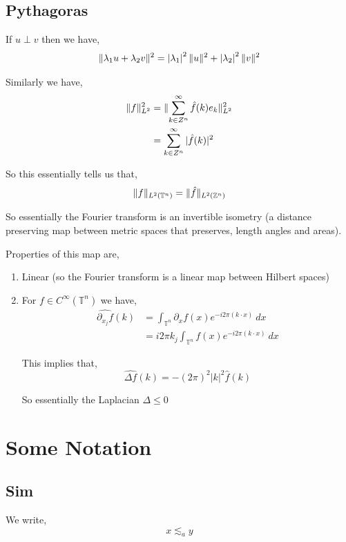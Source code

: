 \subsection{Pythagoras}
If $u \perp v$ then we have, 
\[
  \lVert\lambda_{1} u + \lambda_{2} v\rVert^2 = \left |\lambda_{1} \right |^2 \lVert u\rVert^2 + \left |\lambda_{2} \right |^2 \lVert v\rVert^2
\]

Similarly we have, 
\begin{align*}
  \lVert f\rVert^2_{L^2} &= \lVert\sum_{k \in Z^{n}}^{\infty} \hat{f}(k) e_k\rVert_{L^2}^2\\
                   &= \sum_{k \in Z^{n}}^{\infty}  | \hat{f}(k)|^2
\end{align*}

So this essentially tells us that, 
\[
  \lVert f\rVert_{L^2(\mathbb{T}^{n})} = \lVert\hat{f}\rVert_{L^2(\mathbb{Z}^{n})}
\]

So essentially the Fourier transform is an invertible isometry (a distance preserving map between metric spaces that preserves, length angles and areas).

\vspace{1em}

Properties of this map are,
\begin{enumerate}
  \item Linear (so the Fourier transform is a linear map between Hilbert spaces)
  \item For $f \in C^{\infty}(\mathbb{T}^{n})$ we have, 
    \begin{align*}
      \widehat{\partial_{x_j} f}(k) &= \int_{\mathbb{T}^{n}}^{}  \partial_x f(x) e^{-i 2\pi (k \cdot x)}\ dx\\
                          &= i 2\pi k_j \int_{\mathbb{T}^{n}}^{}  f(x) e^{-i 2\pi (k \cdot x)}\ dx
    \end{align*}

    This implies that, 
    \[
      \widehat{\Delta f}(k) = - (2\pi)^2 |k|^2 \hat{f}(k)
    \]

    So essentially the Laplacian $\Delta \le 0$
\end{enumerate}

\section{Some Notation}

\subsection{Sim}
We write, 
\[
  x \lesssim_a y
\]


